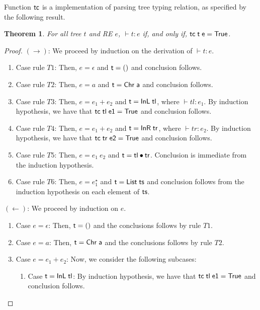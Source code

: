 \documentclass[oneside,12pt]{scrbook}
\newtheorem{Theorem}{Theorem}
\theoremstyle{definition}
\newcommand{\C}[1]{\red{\mathsf{#1}}}
\newcommand{\F}[1]{\green{\mathsf{#1}}}
\newcommand{\V}[1]{\black{\mathsf{#1}}}
\theoremstyle{plain}
\theoremstyle{definition}
\begin{document}
Function \ensuremath{\F{tc}} is a implementation of parsing tree typing relation, as specified by the following
result.
\begin{Theorem}
	For all tree $t$ and RE $e$, $\vdash t : e$ if, and only if, \ensuremath{\F{tc}\;\V{t}\;\V{e}\mathrel{=}\C{True}}.
\end{Theorem}

\begin{proof}
	$(\to)$: We proceed by induction on the derivation of $\vdash t : e$.
	\begin{enumerate}
		\item Case rule $T1$: Then, $e = \epsilon$ and \ensuremath{\V{t}\mathrel{=}\C{()}} and conclusion follows.
		\item Case rule $T2$: Then, $e = a$ and \ensuremath{\V{t}\mathrel{=}\C{Chr}\;\V{a}} and conclusion follows.
		\item Case rule $T3$: Then, $e = e_1 + e_2$ and \ensuremath{\V{t}\mathrel{=}\C{InL}\;\V{tl}}, where $\vdash tl : e_1$.
		By induction hypothesis, we have that \ensuremath{\F{tc}\;\V{tl}\;\V{e1}\mathrel{=}\C{True}} and conclusion follows.
		\item Case rule $T4$: Then, $e = e_1 + e_2$ and \ensuremath{\V{t}\mathrel{=}\C{InR}\;\V{tr}}, where $\vdash tr : e_2$.
		By induction hypothesis, we have that \ensuremath{\F{tc}\;\V{tr}\;\V{e2}\mathrel{=}\C{True}} and conclusion follows.
		\item Case rule $T5$: Then, $e = e_1\:e_2$ and \ensuremath{\V{t}\mathrel{=}\V{tl}\C{\:\bullet\:}\V{tr}}. Conclusion is immediate
		from the induction hypothesis.
		\item Case rule $T6$: Then, $e = e_1^\star$ and \ensuremath{\V{t}\mathrel{=}\C{List}\;\V{ts}} and conclusion follows
		from the induction hypothesis on each element of \ensuremath{\V{ts}}.
	\end{enumerate}
	$(\leftarrow)$: We proceed by induction on $e$.
	\begin{enumerate}
		\item Case $e = \epsilon$: Then, \ensuremath{\V{t}\mathrel{=}\C{()}} and the conclusions follows by rule $T1$.
		\item Case $e = a$: Then, \ensuremath{\V{t}\mathrel{=}\C{Chr}\;\V{a}} and the conclusions follows by rule $T2$.
		\item Case $e = e_1 + e_2$: Now, we consider the following subcases:
		\begin{enumerate}
			\item Case \ensuremath{\V{t}\mathrel{=}\C{InL}\;\V{tl}}: By induction hypothesis, we have that \ensuremath{\F{tc}\;\V{tl}\;\V{e1}\mathrel{=}\C{True}} and conclusion follows.

\end{enumerate}
\end{enumerate}
\end{proof}
\end{document}
